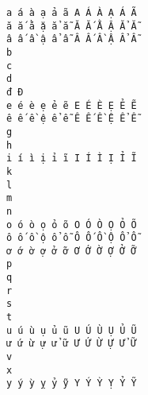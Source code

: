 \documentclass{article}
\begin{document}
\begin{lstlisting}
a á à ạ ả ã A Á À Ạ Ả Ã
ă ắ ằ ặ ẳ ẵ Ă Ắ Ằ Ặ Ẳ Ẵ
â ấ ầ ậ ẩ ẫ Â Ấ Ầ Ậ Ẩ Ẫ
b
c
d
đ Đ
e é è ẹ ẻ ẽ E É È Ẹ Ẻ Ẽ
ê ế ề ệ ể ễ Ê Ế Ề Ệ Ể Ễ
g
h
i í ì ị ỉ ĩ I Í Ì Ị Ỉ Ĩ
k
l
m
n
o ó ò ọ ỏ õ O Ó Ò Ọ Ỏ Õ
ô ố ồ ộ ổ ỗ Ô Ố Ồ Ộ Ổ Ỗ
ơ ớ ờ ợ ở ỡ Ơ Ớ Ờ Ợ Ở Ỡ
p
q
r
s
t
u ú ù ụ ủ ũ U Ú Ù Ụ Ủ Ũ
ư ứ ừ ự ử ữ Ư Ứ Ừ Ự Ử Ữ
v
x
y ý ỳ ỵ ỷ ỹ Y Ý Ỳ Ỵ Ỷ Ỹ
\end{lstlisting}
\end{document}
